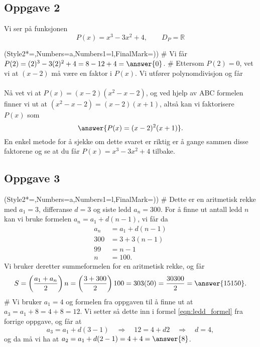 \subsection*{Oppgave 2}
Vi ser på funksjonen
\begin{equation*}
	P(x) = x^3 - 3x^2 + 4, \qquad D_{P} = \mathbb{R}
\end{equation*}
\begin{easylist}[enumerate]
\ListProperties(Style2*=,Numbers=a,Numbers1=l,FinalMark={)})
# Vi får $P(2) = (2)^3 - 3(2)^2 + 4 = 8 - 12 + 4 = \answer{0}$.
# Ettersom $P(2) = 0$, vet vi at $(x-2)$ må være en faktor i $P(x)$.
Vi utfører polynomdivisjon og får \\
 \\
Nå vet vi at $P(x) = (x-2)(x^2 - x - 2)$, og ved hjelp av 
ABC formelen finner vi ut at $(x^2 - x - 2) = (x-2)(x+1)$,
altså kan vi faktorisere $P(x)$ som
\begin{equation*}
	\answer{P(x) = (x-2)^2 (x+1)}.
\end{equation*}
En enkel metode for å sjekke om dette svaret er riktig er å gange sammen disse faktorene og se at du får $P(x) = x^3 - 3x^2 + 4$ tilbake.

\end{easylist}


\subsection*{Oppgave 3}
\begin{easylist}[enumerate]
	\ListProperties(Style2*=,Numbers=a,Numbers1=l,FinalMark={)})
	# Dette er en aritmetisk rekke med $a_1 = 3$, differanse $d=3$
	og siste ledd $a_n = 300$. For å finne ut antall ledd $n$ kan
	vi bruke formelen $a_n = a_1 + d(n-1)$, vi får da
	\begin{align}
		\label{eqn:ledd_formel}a_n &= a_1 + d(n-1) \\
		\nonumber 300 &= 3 + 3(n-1) \\
		\nonumber 99 &= n-1 \\
		\nonumber n &= 100. 
	\end{align}
	Vi bruker deretter summeformelen for en aritmetisk rekke, og får
	\begin{equation*}
		S = \left(\frac{a_1 + a_n}{2}\right)n 
		= \left(\frac{3 + 300}{2}\right)100
		= 303(50) = \frac{30300}{2} = \answer{15150}.
	\end{equation*}
	# Vi bruker $a_1 = 4$ og formelen fra oppgaven til å finne ut at $a_3 = a_1 + 8 = 4 + 8 = 12$.
	Vi setter så dette inn i formel \eqref{eqn:ledd_formel} fra forrige oppgave, og får at 
	\begin{equation*}
		a_3 = a_1 + d(3 -1) \quad \Rightarrow 
		\quad 12 = 4 + d 2  \quad \Rightarrow 
		\quad d = 4,
	\end{equation*}
	og da må vi ha at $a_2 = a_1 + d(2 - 1) = 4 + 4 = \answer{8}$.
\end{easylist}



